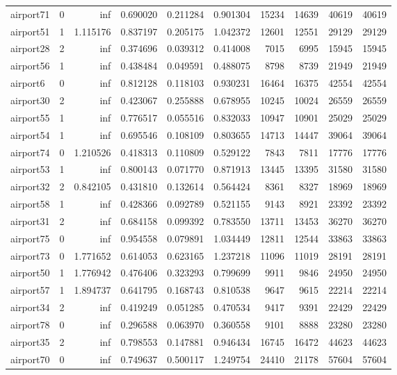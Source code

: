 \begin{longtable}{|l|r|r|r|r|r|r|r|r|r|}
airport71 & 0 & inf & 0.690020 & 0.211284 & 0.901304 & 15234 & 14639 & 40619 & 40619 \\
airport51 & 1 & 1.115176 & 0.837197 & 0.205175 & 1.042372 & 12601 & 12551 & 29129 & 29129 \\
airport28 & 2 & inf & 0.374696 & 0.039312 & 0.414008 & 7015 & 6995 & 15945 & 15945 \\
airport56 & 1 & inf & 0.438484 & 0.049591 & 0.488075 & 8798 & 8739 & 21949 & 21949 \\
airport6 & 0 & inf & 0.812128 & 0.118103 & 0.930231 & 16464 & 16375 & 42554 & 42554 \\
airport30 & 2 & inf & 0.423067 & 0.255888 & 0.678955 & 10245 & 10024 & 26559 & 26559 \\
airport55 & 1 & inf & 0.776517 & 0.055516 & 0.832033 & 10947 & 10901 & 25029 & 25029 \\
airport54 & 1 & inf & 0.695546 & 0.108109 & 0.803655 & 14713 & 14447 & 39064 & 39064 \\
airport74 & 0 & 1.210526 & 0.418313 & 0.110809 & 0.529122 & 7843 & 7811 & 17776 & 17776 \\
airport53 & 1 & inf & 0.800143 & 0.071770 & 0.871913 & 13445 & 13395 & 31580 & 31580 \\
airport32 & 2 & 0.842105 & 0.431810 & 0.132614 & 0.564424 & 8361 & 8327 & 18969 & 18969 \\
airport58 & 1 & inf & 0.428366 & 0.092789 & 0.521155 & 9143 & 8921 & 23392 & 23392 \\
airport31 & 2 & inf & 0.684158 & 0.099392 & 0.783550 & 13711 & 13453 & 36270 & 36270 \\
airport75 & 0 & inf & 0.954558 & 0.079891 & 1.034449 & 12811 & 12544 & 33863 & 33863 \\
airport73 & 0 & 1.771652 & 0.614053 & 0.623165 & 1.237218 & 11096 & 11019 & 28191 & 28191 \\
airport50 & 1 & 1.776942 & 0.476406 & 0.323293 & 0.799699 & 9911 & 9846 & 24950 & 24950 \\
airport57 & 1 & 1.894737 & 0.641795 & 0.168743 & 0.810538 & 9647 & 9615 & 22214 & 22214 \\
airport34 & 2 & inf & 0.419249 & 0.051285 & 0.470534 & 9417 & 9391 & 22429 & 22429 \\
airport78 & 0 & inf & 0.296588 & 0.063970 & 0.360558 & 9101 & 8888 & 23280 & 23280 \\
airport35 & 2 & inf & 0.798553 & 0.147881 & 0.946434 & 16745 & 16472 & 44623 & 44623 \\
airport70 & 0 & inf & 0.749637 & 0.500117 & 1.249754 & 24410 & 21178 & 57604 & 57604 \\

\end{longtable}
